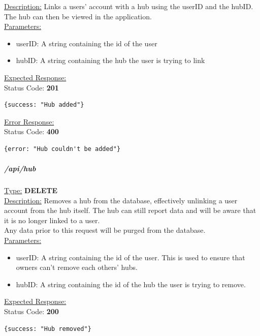 \documentclass[preprint,12pt,3p]{elsarticle}
\newcommand{\forceindent}{\leavevmode{\parindent=1em\indent}}
\begin{document}
\underline{Description:} Links a users' account with a hub using the userID and the hubID. The hub can then be viewed in the application.\\

\underline{Parameters:}
\begin{itemize}
\item userID: A string containing the id of the user

\item hubID: A string containing the hub the user is trying to link
\end{itemize}
\underline{Expected Response:}\\[5pt]
\forceindent Status Code: \textbf{201} \\
\begin{verbatim}
{success: "Hub added"}
\end{verbatim}

\underline{Error Response:}\\[5pt]
\forceindent Status Code: \textbf{400} \\
\begin{verbatim}
{error: "Hub couldn't be added"}
\end{verbatim}



\subparagraph*{/api/hub}
\underline{Type:} \textbf{DELETE}\\

\underline{Description:} Removes a hub from the database, effectively unlinking a user account from the hub itself. The hub can still report data and will be aware that it is no longer linked to a user.\\
Any data prior to this request will be purged from the database.\\

\underline{Parameters:}
\begin{itemize}
\item userID: A string containing the id of the user. This is used to ensure that owners can't remove each others' hubs.

\item hubID: A string containing the id of the hub the user is trying to remove.
\end{itemize}

\underline{Expected Response:}\\[5pt]
\forceindent Status Code: \textbf{200} \\
\begin{verbatim}
{success: "Hub removed"}
\end{verbatim}
\end{document}
